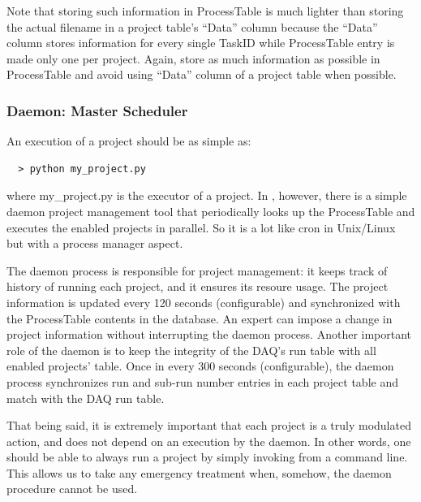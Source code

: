 Note that storing such information in ProcessTable is much lighter than 
storing the actual filename in a project table's ``Data'' column because 
the ``Data'' column stores information for every single TaskID while 
ProcessTable entry is made only one per project. Again, store as much
information as possible in ProcessTable and avoid using ``Data'' column
of a project table when possible.

\subsubsection{Daemon: Master Scheduler}
An execution of a project should be as simple as:
\begin{lstlisting}
  > python my_project.py
\end{lstlisting}
where my\_project.py is the executor of a project. In {\pubs}, however,
there is a simple daemon project management tool that periodically 
looks up the ProcessTable and executes the enabled projects in parallel. 
So it is a lot like {\ttfamily cron} in Unix/Linux but with a process
manager aspect.  

The daemon process is responsible for project management: it keeps track
of history of running each project, and it ensures its resoure usage. 
The project information is updated every 120 seconds (configurable) and 
synchronized with the ProcessTable contents in the database. An expert
can impose a change in project information without interrupting the daemon
process. Another important role of the daemon is to keep the integrity of
the DAQ's run table with all enabled projects' table. Once in every 300
seconds (configurable), the daemon process synchronizes run and sub-run
number entries in each project table and match with the DAQ run table.

That being said, it is extremely important that each project is a truly
modulated action, and does not depend on an execution by the daemon. In
other words, one should be able to always run a project by simply invoking
from a command line. This allows us to take any emergency treatment when,
somehow, the daemon procedure cannot be used.

